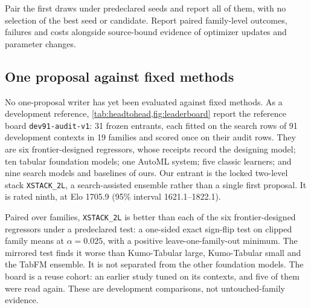 Pair the first draws under predeclared seeds and report all of them, with
no selection of the best seed or candidate. Report paired family-level
outcomes, failures and costs alongside source-bound evidence of optimizer
updates and parameter changes. 

\subsection{One proposal against fixed methods}\label{sub:results-headtohead}

No one-proposal writer has yet been evaluated against fixed methods. As a
development reference, \cref{tab:headtohead,fig:leaderboard} report the
reference board \texttt{dev91-audit-v1}: 31 frozen entrants, each fitted on
the search rows of 91 development contexts in 19 families and scored once on
their audit rows. They are six frontier-designed regressors, whose receipts
record the designing model; ten tabular foundation models; one AutoML system;
five classic learners; and nine search models and baselines of ours. Our
entrant is the locked two-level stack \texttt{XSTACK\_2L}, a search-assisted
ensemble rather than a single first proposal. It is rated ninth, at Elo
\num{1705.9} (95\% interval \num{1621.1}--\num{1822.1}).

Paired over families, \texttt{XSTACK\_2L} is better than each of the six
frontier-designed regressors under a predeclared test: a one-sided exact
sign-flip test on clipped family means at $\alpha=0.025$, with a positive
leave-one-family-out minimum. The mirrored test finds it worse than
Kumo-Tabular large, Kumo-Tabular small and the TabFM ensemble. It is not
separated from the other foundation models. The board is a reuse cohort: an
earlier study tuned on its contexts, and five of them were read again. These
are development comparisons, not untouched-family evidence.

